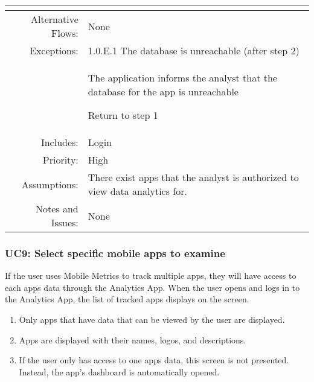 \documentclass[12pt,oneside,letterpaper]{article}
\newenvironment{packed_enumerate}{ %
\vspace{-7mm}
\begin{enumerate}
  \setlength{\itemsep}{0pt}
  \setlength{\parskip}{0pt}
  \setlength{\parsep}{0pt}
}{\end{enumerate}
\vspace{-8mm}}
\begin{document}
\begin{longtable}{|r|p{3.8in}|}
\begin{packed_enumerate}
\end{packed_enumerate}\\
\hline
Alternative Flows:&None\\
\hline
Exceptions:&1.0.E.1 The database is unreachable (after step 2)\\
&  %
\begin{packed_enumerate}
\item The application informs the analyst that the database for the app is unreachable
\item Return to step 1
\end{packed_enumerate}\\
\hline
Includes:&Login\\
\hline
Priority:&High\\
\hline
Assumptions:&There exist apps that the analyst is authorized to view data analytics for. \\
\hline
Notes and Issues:&None\\
\hline

\end{longtable}
\renewcommand{\enumii}{\arabic{\enumii}} %
\newpage
\subsubsection{\label{Display list of app when user opens analytics app}UC9: Select specific mobile apps to examine}
If the user uses Mobile Metrics to track multiple apps, they will have access to each apps data through the Analytics App. When the user opens and logs in to the Analytics App, the list of tracked apps displays on the screen.
\begin{enumerate}
\item Only apps that have data that can be viewed by the user are displayed.
\item Apps are displayed with their names, logos, and descriptions.
\item If the user only has access to one apps data, this screen is not presented. Instead, the app's dashboard is automatically opened.
\end{enumerate}
\end{document}
